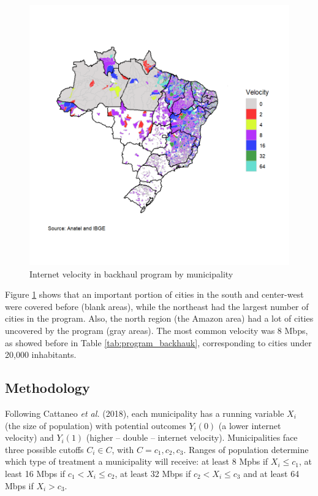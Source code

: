 \documentclass[
  12pt,
]{article}
\begin{document}
\begin{figure}
\centering
\includegraphics{artigo1_files/figure-latex/unnamed-chunk-1-1.png}
\caption{Internet velocity in backhaul program by municipality
\label{fig:1}}
\end{figure}

Figure \ref{fig:1} shows that an important portion of cities in the
south and center-west were covered before (blank areas), while the
northeast had the largest number of cities in the program. Also, the
north region (the Amazon area) had a lot of cities uncovered by the
program (gray areas). The most common velocity was 8 Mbps, as showed
before in Table \ref{tab:program_backhauk}, corresponding to cities
under 20,000 inhabitants.

\hypertarget{methodology}{%
\subsection{Methodology}\label{methodology}}

Following Cattaneo \emph{et al.} (2018), each municipality has a running
variable \(X_i\) (the size of population) with potential outcomes
\(Y_i(0)\) (a lower internet velocity) and \(Y_i(1)\) (higher -- double
-- internet velocity). Municipalities face three possible cutoffs
\(C_i \in C\), with \(C = {c_1, c_2, c_3}\). Ranges of population
determine which type of treatment a municipality will receive: at least
8 Mpbs if \(X_i \leq c_1\), at least 16 Mbps if \(c_1 < X_i \leq c_2\),
at least 32 Mbps if \(c_2 < X_i \leq c_3\) and at least 64 Mbps if
\(X_i > c_3\).
\end{document}
